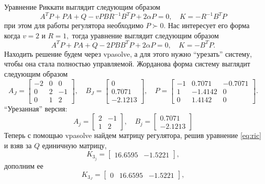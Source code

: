 Уравнение Риккати выглядит следующим образом
\begin{equation}
    A^TP+PA+Q-vPBR^{-1}B^TP+2\alpha P=0,\quad K=-R^{-1}B^TP
\end{equation}
при этом для работы регулятора необходимо $P\succ0$. Нас интересует его форма когда
$v=2$ и $R=1,$ тогда уравнение выглядит следующим образом
\begin{equation}
    A^TP+PA+Q-2PBB^TP+2\alpha P=0,\quad K=-B^TP.
    \label{eq:ric}
\end{equation}
Находить решение будем через vpasolve, а для этого нужно ``урезать'' систему,
чтобы она стала полностью управляемой. Жорданова форма систему выглядит
следующим образом
\begin{equation}
    A_J=\begin{bmatrix}
        -2&0&0\\
        0&2&-1\\
        0&1&2
    \end{bmatrix},\quad
    B_J=\begin{bmatrix}
        0\\0.7071\\-2.1213
    \end{bmatrix},\quad
    P=\begin{bmatrix}
        -1&	0.7071&	-0.7071\\
        1&	-1.4142&	0\\
        0&	1.4142&	0
    \end{bmatrix}.
    \label{eq:sys1jourdan}
\end{equation}
``Урезанная'' версия:
\begin{equation}
    A_j=\begin{bmatrix}
        2&-1\\
        1&2
    \end{bmatrix},\quad
    B_j=\begin{bmatrix}
        0.7071\\-2.1213
    \end{bmatrix}
    \label{eq:sys1j}
\end{equation}
Теперь с помощью vpasolve найдем матрицу регулятора, решив уравнение \ref{eq:ric}
и взяв за $Q$ единичную матрицу,
\begin{equation*}
    K_{3_j}=\begin{bmatrix}
        16.6595& -1.5221
    \end{bmatrix},
\end{equation*}
дополним ее
\begin{equation*}
    K_{3_J}=\begin{bmatrix}
        0&16.6595& -1.5221
    \end{bmatrix},
\end{equation*}
